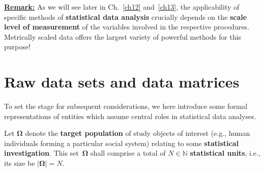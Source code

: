 \noindent
\underline{\textbf{Remark:}} As we will see later in Ch.~\ref{ch12}
and~\ref{ch13}, the applicability of specific methods of
\textbf{statistical data analysis} crucially depends on the
\textbf{scale level of measurement} of the variables involved in
the respective procedures. Metrically scaled data offers the
largest variety of powerful methods for this purpose!

\section[Raw data sets and data matrices]{Raw data sets and data
matrices}
To set the stage for subsequent considerations, we here introduce
some formal representations of entities which assume central roles
in statistical data analyses.

\medskip
\noindent
Let $\boldsymbol{\Omega}$ denote the \textbf{target population} of 
study objects of interest (e.g., human individuals forming a 
particular social system) relating to some \textbf{statistical 
investigation}. This set~$\boldsymbol{\Omega}$ shall comprise a 
total of $N \in \mathbb{N}$ \textbf{statistical units}, i.e., its 
size be $|\boldsymbol{\Omega}|=N$.

